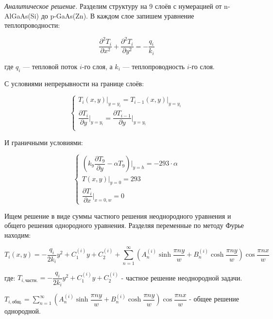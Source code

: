 \documentclass[a4paper,12pt]{article}
\begin{document}
	\quad \textit{Аналитическое решение.} Разделим структуру на 9 слоёв с нумерацией от n-AlGaAs(Si) до p-GaAs(Zn). В каждом слое запишем уравнение теплопроводности:
	
	\begin{equation}
		\dfrac{\partial^2 T_i}{\partial x^2} + \dfrac{\partial^2 T_i}{\partial y^2}  = -\dfrac{q_i}{k_i} 
	\end{equation}
	
	\begin{center}
		где $q_i$ — тепловой поток $i$-го слоя, а $k_i$ — теплопроводность $i$-го слоя.
	\end{center}
	
	\quad С условиями непрерывности на границе слоёв:
	
	\begin{equation}
		\begin{cases}
			T_i(x, y)\bigg|_{y=y_i} = T_{i-1}(x, y)\bigg|_{y=y_i} \\
			\dfrac{\partial T_i}{\partial y} \bigg|_{y=y_i} = \dfrac{\partial T_{i-1}}{\partial y}\bigg|_{y=y_i} \\
		\end{cases}
	\end{equation}
	
	
	\quad И граничными условиями: 
	
	\begin{equation}
		\begin{cases}
			\left( k_9\dfrac{\partial T_9}{\partial y} - \alpha T_9\right)\bigg|_{y=h} = -293 \cdot \alpha \\
			T(x, y) \bigg|_{y=0} = 293 \\
			\dfrac{\partial T_i}{\partial x}\bigg|_{x=0,w} = 0 
		\end{cases}
	\end{equation}
	
	\quad Ищем решение в виде суммы частного решения неоднородного уравнения и общего решения однородного уравнения. Разделяя переменные по методу Фурье находим: 
	
	\begin{equation}
		T_i(x, y)  = -\dfrac{q_i }{2k_i} y^2 + C^{(i)}_1 y + C^{(i)}_2 + \displaystyle\sum\limits_{n=1}^{\infty} \left(A^{(i)}_n \sinh{\dfrac{\pi n y}{w}}+ B^{(i)}_n \cosh{\dfrac{\pi n y}{w}} \right) \cos{\dfrac{\pi n x}{w}}
	\end{equation}
	
	\begin{center}
		где: $T_{i, \text{частн.}} =  -\dfrac{q_i }{2k_i} y^2 + C^{(i)}_1 y + C^{(i)}_2$ -  частное решение неоднородной задачи.
		
		$T_{i, \text{общ.}} = \displaystyle\sum\limits_{n=1}^{\infty} \left(A^{(i)}_n \sinh{\dfrac{\pi n y}{w}}+ B^{(i)}_n \cosh{\dfrac{\pi n y}{w}} \right) \cos{\dfrac{\pi n x}{w}}$ - общее решение однородной. 
	\end{center}
	
\end{document}
